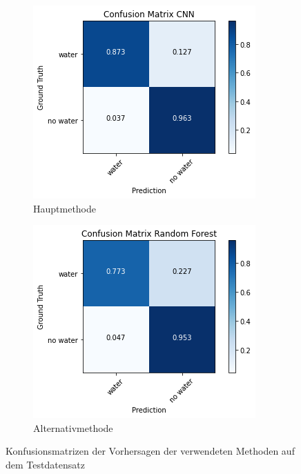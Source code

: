 \begin{figure}
    \centering
    \begin{subfigure}{0.45\textwidth}
        \centering
        \includegraphics[width=\textwidth]{images/cm_cnn.png}
        \caption{Hauptmethode}
        \label{fig:cm_cnn}
    \end{subfigure}
    \begin{subfigure}{0.45\textwidth}
        \centering
        \includegraphics[width=\textwidth]{images/cm_rndf.png}
        \caption{Alternativmethode}
        \label{fig:cm_rndf}
    \end{subfigure}
    \caption{Konfusionsmatrizen der Vorhersagen der verwendeten Methoden auf dem Testdatensatz}
\end{figure}

